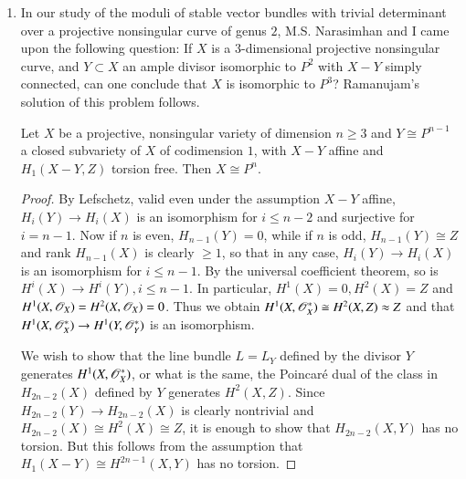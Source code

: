 \begin{enumerate}
Let $\begin{pmatrix}f & k\\ h & g\end{pmatrix}$ be the unimodular matrix over $A$ reducing 
to $\oset{\frac{\bar{X}}{\bar{Z}}\; \frac{\bar{T}}{\bar{Y}}}$. Then 
the map $M(2,C)\to SL(2,C)$ given by
$$
\begin{pmatrix}
x & t\\
z & y
\end{pmatrix}
\mapsto
\begin{pmatrix}
f(x,y,z,t) & k(x,y,z,t)\\
h(x,y,z,t) & g(x,y,z,t)
\end{pmatrix}
$$
is\pageoriginale easily seen to be a retraction, which is impossible 
since $M(2,C)$ is contractible, and $SL(2,C)$ is homotopically 
equi\-valent to the three dimensional sphere.
\item In our study of the moduli of stable vector bundles with trivial 
determinant over a projective nonsingular curve of genus $2$, M.S. 
Narasimhan and I came upon the following question: If $X$ is a 
$3$-dimensional projective nonsingular curve, and $Y\subset X$ an 
ample divisor isomorphic to $P^2$ with $X-Y$ simply connected, can one 
conclude that $X$ is isomorphic to $P^3$? Ramanujam's solution of this 
problem follows.
\begin{theorem*}
Let $X$ be a projective, nonsingular variety of dimension $n\geq 3$ 
and $Y\cong P^{n-1}$ a closed subvariety of $X$ of codimension $1$, 
with $X-Y$ affine and $H_1(X-Y,Z)$ torsion free. Then $X\cong P^n$.
\end{theorem*}
\begin{proof}
By Lefschetz, valid even under the assumption $X-Y$ affine, $H_i(Y)\to 
H_i(X)$ is an isomorphism for $i\leq n-2$ and surjective for $i=n-1$. 
Now if $n$ is even, $H_{n-1}(Y)=0$, while if $n$ is odd, 
$H_{n-1}(Y)\cong Z$ and rank $H_{n-1}(X)$ is clearly $\geq 1$, so that 
in any case, $H_i(Y)\to H_i(X)$ is an isomorphism for $i\leq n-1$. By 
the universal coefficient theorem, so is $H^i(X)\to H^i(Y), i\leq n-1$. 
In particular, $H^1(X)=0, H^2(X)=Z$ and $H^1(X,\mathscr{O}_X)=H^2(X,\mathscr{O}_X)=0$. 
Thus we obtain $H^1(X,\mathscr{O}_X^*)\cong H^2(X, Z)\approx Z$ and that 
$H^1(X,\mathscr{O}_X^*)\to H^1(Y,\mathscr{O}_Y^*)$ is an isomorphism. 

We wish to show that the line bundle $L=L_Y$ defined by the divisor 
$Y$ generates $H^1(X,\mathscr{O}_X^*)$, or what is the same, the Poincar\'e 
dual of the class in $H_{2n-2}(X)$ defined by $Y$ generates 
$H^2(X,Z)$. Since $H_{2n-2}(Y)\to H_{2n-2}(X)$ is clearly nontrivial 
and $H_{2n-2}(X)\cong H^2(X)\cong Z$, it is enough to show that 
$H_{2n-2}(X,Y)$ has no torsion. But this follows from the assumption 
that $H_1(X-Y)\cong H^{2n-1}(X,Y)$ has no torsion.


\end{proof}
\end{enumerate}
